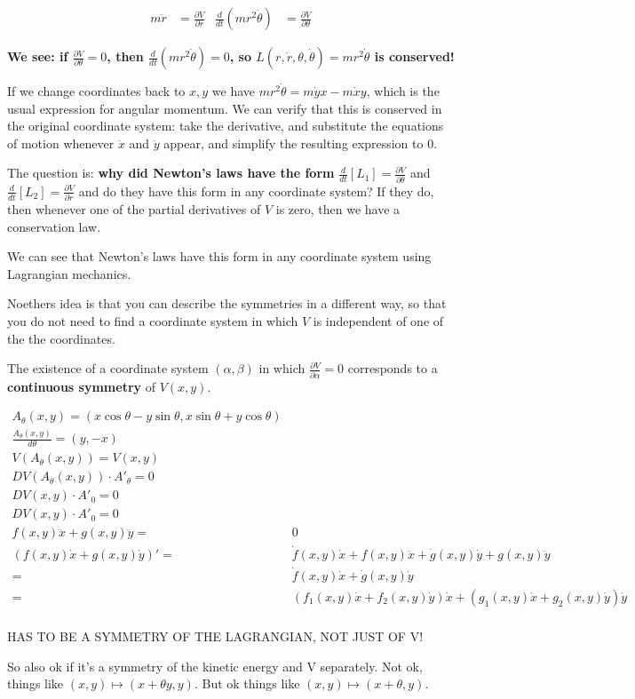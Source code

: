 \documentclass[a4paper, 11pt]{article}
\theoremstyle{definition}
\begin{document}
\begin{align*}
  m \ddot r &= \frac{\partial V}{\partial r} &
  \frac{d}{dt}(m r^2 \dot \theta) &= \frac{\partial V}{\partial \theta}
\end{align*}

\textbf{We see: if $\frac{\partial V}{\partial \theta} = 0$, then $\frac{d}{dt}(m r^2 \dot \theta) = 0$, so $L(r,\dot r, \theta, \dot \theta) = m r^2 \dot \theta$ is conserved!}

If we change coordinates back to $x,y$ we have $m r^2 \dot \theta = m \dot y x - m \dot x y$, which is the usual expression for angular momentum. We can verify that this is conserved in the original coordinate system: take the derivative, and substitute the equations of motion whenever $\ddot x$ and $\ddot y$ appear, and simplify the resulting expression to $0$.

The question is: \textbf{why did Newton's laws have the form} $\frac{d}{dt}[L_1] = \frac{\partial V}{\partial \theta}$ and $\frac{d}{dt}[L_2] = \frac{\partial V}{\partial r}$ and do they have this form in any coordinate system? If they do, then whenever one of the partial derivatives of $V$ is zero, then we have a conservation law.

We can see that Newton's laws have this form in any coordinate system using Lagrangian mechanics.

Noethers idea is that you can describe the symmetries in a different way, so that you do not need to find a coordinate system in which $V$ is independent of one of the the coordinates.


The existence of a coordinate system $(\alpha, \beta)$ in which $\frac{\partial V}{\partial \alpha} = 0$ corresponds to a \textbf{continuous symmetry} of $V(x,y)$.

\begin{align*}
  A_\theta (x,y) = (x \cos \theta - y \sin \theta, x \sin \theta + y \cos \theta) \\
  \frac{A_\theta(x,y)}{d\theta} = (y,-x) \\
  V(A_\theta(x,y)) = V(x,y) \\
  DV(A_\theta(x,y))\cdot A'_\theta = 0 \\
  DV(x,y)\cdot A'_0 = 0 \\
  DV(x,y)\cdot A'_0 = 0 \\
  f(x,y) \ddot x + g(x,y) \ddot y =& 0 \\
  (f(x,y) \dot x + g(x,y) \dot y)' =&
  \dot f(x,y) \dot x + f(x,y) \ddot x + \dot g(x,y) \dot y + g(x,y) \ddot y \\
  =& \dot f(x,y) \dot x + \dot g(x,y) \dot y \\
  =&  (f_1(x,y) \dot x + f_2(x,y) \dot y) \dot x + (g_1(x,y) \dot x + g_2(x,y) \dot y) \dot y \\
\end{align*}

HAS TO BE A SYMMETRY OF THE LAGRANGIAN, NOT JUST OF V!

So also ok if it's a symmetry of the kinetic energy and V separately.
Not ok, things like $(x,y) \mapsto (x + \theta y, y)$.
But ok things like $(x,y) \mapsto (x + \theta, y)$.
\end{document}
